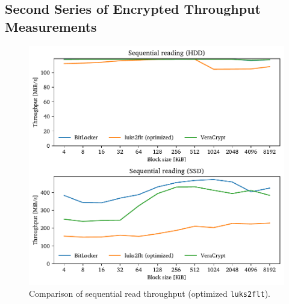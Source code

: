 \subsection{Second Series of Encrypted Throughput Measurements}
\label{chap:performance.results.encryptedseries2}

\begin{figure}[htb!]
	\center
	\includegraphics[scale=1]{../fig/performance.results.optseq.pdf}
	\caption[
		Comparison of sequential read throughput (optimized \texttt{luks2flt})
	]{
		Comparison of sequential read throughput (optimized \texttt{luks2flt}). 
	}
	\label{fig:performance.results.optseq}
\end{figure}


